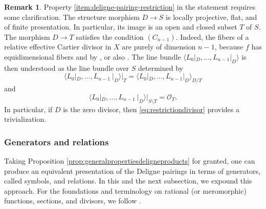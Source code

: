 \documentclass[JEP,XML,SOM,Unicode,published]{cedram}
\theoremstyle{plain}
\theoremstyle{definition}
\newtheorem{remark}[theorem]{Remark}
\newcommand{\Ocal}{\mathcal O}
\begin{document}
\begin{remark}\label{rmk:clarification-restriction}
Property \eqref{item:deligne-pairing-restriction} in the statement requires some clarification. The structure morphism $D\to S$ is locally projective, flat, and of finite presentation. In particular, its image is an open and closed subset $T$ of $S$. The morphism $D\to T$ satisfies the condition $(C_{n-1})$. Indeed, the fibers of a relative effective Cartier divisor in $X$ are purely of dimension $n-1$, because $f$ has equidimensional fibers and by \cite[Prop.\,16.4.1]{EGAIV1}, or also \cite[Cor.\,5.2.4]{EGAIV2}. The line bundle $\langle L_{0}|_D,\ldots,L_{n-1}|_D\rangle$ is then understood as the line bundle over $S$ determined by
\begin{displaymath}
\langle L_{0}|_D,\ldots,L_{n-1}\ |_D\rangle\big|_{T}=\langle L_{0}|_D,\ldots,L_{n-1}|_D\rangle_{D/T}
\end{displaymath}
and
\begin{displaymath}
\langle L_{0}|_D,\ldots,L_{n-1}\ |_D\rangle\big|_{S\setminus T}=\Ocal_{T}.
\end{displaymath}
In particular, if $D$ is the zero divisor, then \eqref{eq:restrictiondivisor} provides a trivialization.
\end{remark}

\subsubsection{Generators and relations}\label{subsubsec:generators-relations}
Taking Proposition \ref{prop:generalpropertiesdeligneproducts} for granted, one can produce an equivalent presentation of the Deligne pairings in terms of generators, called symbols, and relations. In this and the next subsection, we expound this approach. For the foundations and terminology on rational (or meromorphic) functions, sections, and divisors, we follow \cite[ \& ]{EGAIV4}.
\end{document}
